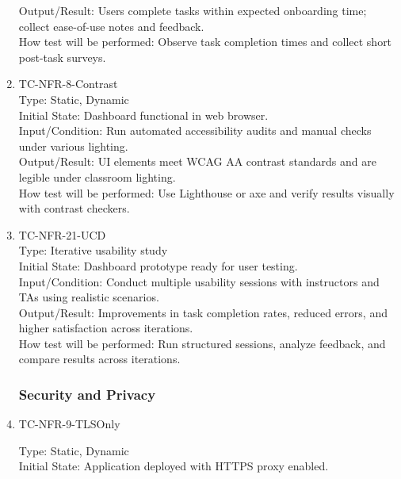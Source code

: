 \documentclass[12pt, titlepage]{article}
\begin{document}
\begin{enumerate}
Output/Result: Users complete tasks within expected onboarding time; collect ease-of-use notes and feedback.\\

How test will be performed: Observe task completion times and collect short post-task surveys.

\item{TC-NFR-8-Contrast\\}
Type: Static, Dynamic\\

Initial State: Dashboard functional in web browser.\\

Input/Condition: Run automated accessibility audits and manual checks under various lighting.\\

Output/Result: UI elements meet WCAG AA contrast standards and are legible under classroom lighting.\\

How test will be performed: Use Lighthouse or axe and verify results visually with contrast checkers.

\item{TC-NFR-21-UCD\\}
Type: Iterative usability study\\

Initial State: Dashboard prototype ready for user testing.\\

Input/Condition: Conduct multiple usability sessions with instructors and TAs using realistic scenarios.\\

Output/Result: Improvements in task completion rates, reduced errors, and higher satisfaction across iterations.\\

How test will be performed: Run structured sessions, analyze feedback, and compare results across iterations.

\subsubsection{Security and Privacy}

\item{TC-NFR-9-TLSOnly\\}

Type: Static, Dynamic\\

Initial State: Application deployed with HTTPS proxy enabled.\\


\end{enumerate}
\end{document}

